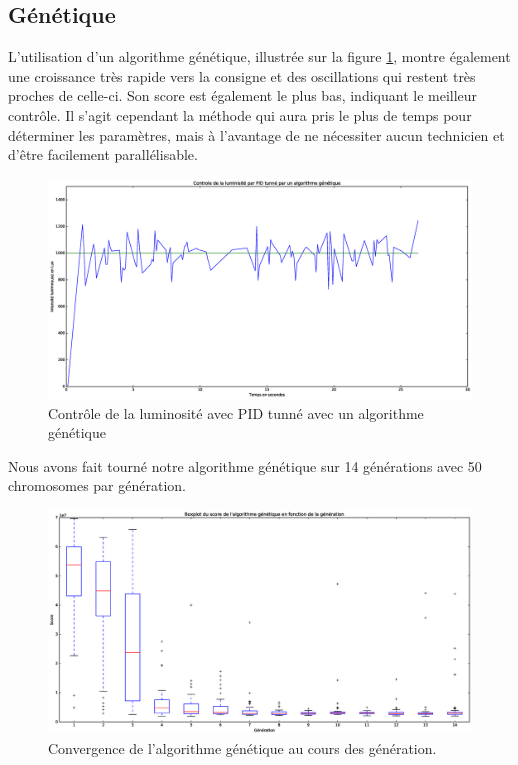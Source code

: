 \documentclass[a4paper,10pt]{report}
\begin{document}
\subsection{Génétique}
L'utilisation d'un algorithme génétique, illustrée sur la figure \ref{fig:genetique}, montre également une croissance très rapide vers la consigne et des oscillations qui restent très proches de celle-ci.
Son score est également le plus bas, indiquant le meilleur contrôle.
Il s'agit cependant la méthode qui aura pris le plus de temps pour déterminer les paramètres, mais à l'avantage de ne nécessiter aucun technicien et d'être facilement parallélisable.
\begin{figure}[hb!]
   \centering
   \includegraphics[scale=0.35]{Genetic.eps}
   \caption{\label{fig:genetique} Contrôle de la luminosité avec PID tunné avec un algorithme génétique}
\end{figure}

Nous avons fait tourné notre algorithme génétique sur 14 générations avec 50 chromosomes par génération.
\begin{figure}[hb!]
   \centering
   \includegraphics[scale=0.35]{GeneticBoxplot.eps}
    \caption{\label{fig:convergence} Convergence de l'algorithme génétique au cours des génération.}
\end{figure}
\end{document}
